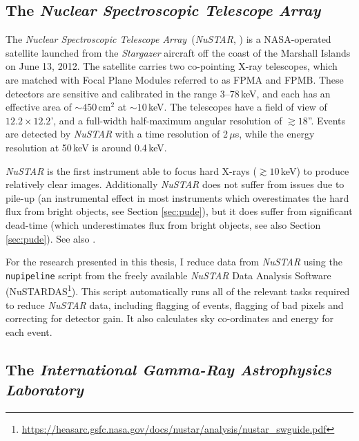 \subsection{The \textit{Nuclear Spectroscopic Telescope Array}}

\par The \textit{Nuclear Spectroscopic Telescope Array}\indexnustar\ (\textit{NuSTAR}, \citealp{Harrison_NuStar}) is a NASA-operated satellite launched from the \textit{Stargazer} aircraft off the coast of the Marshall Islands on June 13, 2012.  The satellite carries two co-pointing X-ray telescopes, which are matched with Focal Plane Modules referred to as FPMA and FPMB.  These detectors are sensitive and calibrated in the range 3--78\,keV, and each has an effective area of $\sim450$\,cm$^2$ at $\sim10$\,keV.  The telescopes have a field of view of $12.2\times12.2$', and a full-width half-maximum angular resolution of $\gtrsim18$''.  Events are detected by \textit{NuSTAR} with a time resolution of 2\,$\mu$s, while the energy resolution at 50\,keV is around 0.4\,keV.
\par \textit{NuSTAR} is the first instrument able to focus hard X-rays ($\gtrsim10$\,keV) to produce relatively clear images.  Additionally \textit{NuSTAR} does not suffer from issues due to pile-up (an instrumental effect in most instruments which overestimates the hard flux from bright objects, see Section \ref{sec:pude}), but it does suffer from significant dead-time (which underestimates flux from bright objects, see also Section \ref{sec:pude}).  See also \citet{Bachetti_dt}.
\par For the research presented in this thesis, I reduce data from \textit{NuSTAR} using the \texttt{nupipeline} script from the freely available \textit{NuSTAR} Data Analysis Software (NuSTARDAS\footnote{\url{https://heasarc.gsfc.nasa.gov/docs/nustar/analysis/nustar_swguide.pdf}}).  This script automatically runs all of the relevant tasks required to reduce \textit{NuSTAR} data, including flagging of events, flagging of bad pixels and correcting for detector gain.  It also calculates sky co-ordinates and energy for each event.

\subsection{The \textit{International Gamma-Ray Astrophysics Laboratory}}


